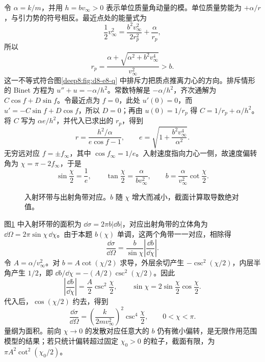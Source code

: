 \begin{solution}
令 $\alpha=k/m$，并用 $h=bv_\infty>0$ 表示单位质量角动量的模。单位质量势能为 $+\alpha/r$，与引力势的符号相反。最近点处的能量式为
\[
 \frac12v_\infty^2=\frac{b^2v_\infty^2}{2r_p^2}+\frac\alpha{r_p},
\]
所以
\[
 \boxed{r_p=\frac{\alpha+\sqrt{\alpha^2+b^2v_\infty^4}}{v_\infty^2}}>b.
\]
这一不等式符合图\ref{deep8:fig:d8-e8-q} 中排斥力把质点推离力心的方向。排斥情形的 Binet 方程为 $u''+u=-\alpha/h^2$。常数特解是 $-\alpha/h^2$，齐次通解为 $C\cos f+D\sin f$。令最近点为 $f=0$，此处 $u'(0)=0$，而 $u'=-C\sin f+D\cos f$，所以 $D=0$；再由 $u(0)=1/r_p$ 得 $C=1/r_p+\alpha/h^2$。将 $C$ 写为 $\alpha e/h^2$，并代入已求出的 $r_p$，得到
\[
 r=\frac{h^2/\alpha}{e\cos f-1},\qquad
 e=\sqrt{1+\frac{b^2v_\infty^4}{\alpha^2}}.
\]
无穷远对应 $f=\pm f_\infty$，其中 $\cos f_\infty=1/e$。入射速度指向力心一侧，故速度偏转角为 $\chi=\pi-2f_\infty$，于是
\[
 \sin\frac\chi2=\frac1e,\qquad
 \boxed{\tan\frac\chi2=\frac\alpha{bv_\infty^2}},\qquad
 b=\frac\alpha{v_\infty^2}\cot\frac\chi2.
\]
\begin{figure}[H]\centering
{}
\caption{入射环带与出射角带对应。$b$ 随 $\chi$ 增大而减小，截面计算取导数绝对值。}\label{deep8:fig:d8-e8-s}
\end{figure}
图\ref{deep8:fig:d8-e8-s} 中入射环带的面积为 $\dd\sigma=2\pi b|\dd b|$，对应出射角带的立体角为 $\dd\Omega=2\pi\sin\chi\,\dd\chi$。由于本题 $b(\chi)$ 单调，这两个角带一一对应，相除得
\[
 \frac{\dd\sigma}{\dd\Omega}
 =\frac b{\sin\chi}\left|\frac{\dd b}{\dd\chi}\right|.
\]
令 $A=\alpha/v_\infty^2$。对 $b=A\cot(\chi/2)$ 求导，外层余切产生 $-\csc^2(\chi/2)$，内层半角产生 $1/2$，即 $\dd b/\dd\chi=-(A/2)\csc^2(\chi/2)$。因此
\[
 \left|\frac{\dd b}{\dd\chi}\right|=\frac A2\csc^2\frac\chi2,
 \qquad \sin\chi=2\sin\frac\chi2\cos\frac\chi2.
\]
代入后，$\cos(\chi/2)$ 约去，得到
\[
 \boxed{\frac{\dd\sigma}{\dd\Omega}=
 \left(\frac{k}{2mv_\infty^2}\right)^2\csc^4\frac\chi2},\qquad 0<\chi<\pi.
\]
量纲为面积。前向 $\chi\to0$ 的发散对应任意大的 $b$ 仍有微小偏转，是无限作用范围模型的结果；若只统计偏转超过固定 $\chi_0>0$ 的粒子，截面有限，为 $\pi A^2\cot^2(\chi_0/2)$。
\end{solution}



